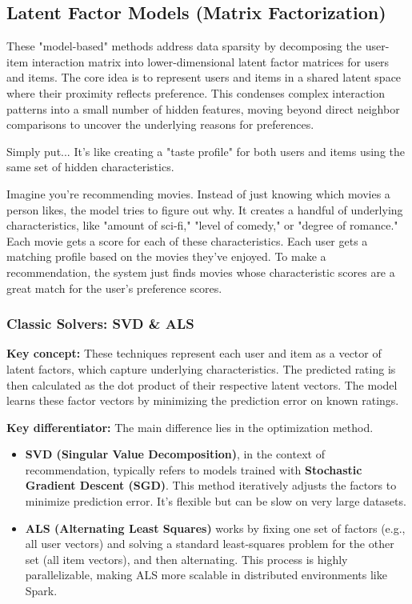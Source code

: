 \documentclass{article}
\begin{document}
    \subsection{Latent Factor Models (Matrix Factorization)}
    These "model-based" methods address data sparsity by decomposing the user-item interaction matrix into lower-dimensional latent factor matrices for users and items. The core idea is to represent users and items in a shared latent space where their proximity reflects preference. This condenses complex interaction patterns into a small number of hidden features, moving beyond direct neighbor comparisons to uncover the underlying reasons for preferences.
    
    \begin{asidebox}{Simply put...}
    It's like creating a "taste profile" for both users and items using the same set of hidden characteristics.
    
    Imagine you're recommending movies. Instead of just knowing which movies a person likes, the model tries to figure out why. It creates a handful of underlying characteristics, like "amount of sci-fi," "level of comedy," or "degree of romance." Each movie gets a score for each of these characteristics. Each user gets a matching profile based on the movies they've enjoyed. To make a recommendation, the system just finds movies whose characteristic scores are a great match for the user's preference scores.
    \end{asidebox}

    \subsubsection{Classic Solvers: SVD \& ALS}
\noindent\textbf{Key concept:} These techniques represent each user and item as a vector of latent factors, which capture underlying characteristics. The predicted rating is then calculated as the dot product of their respective latent vectors. The model learns these factor vectors by minimizing the prediction error on known ratings.

\noindent\textbf{Key differentiator:} The main difference lies in the optimization method.
    \begin{itemize}
        \item \textbf{SVD (Singular Value Decomposition)}, in the context of recommendation, typically refers to models trained with \textbf{Stochastic Gradient Descent (SGD)}. This method iteratively adjusts the factors to minimize prediction error. It's flexible but can be slow on very large datasets.
        \item \textbf{ALS (Alternating Least Squares)} works by fixing one set of factors (e.g., all user vectors) and solving a standard least-squares problem for the other set (all item vectors), and then alternating. This process is highly parallelizable, making ALS more scalable in distributed environments like Spark.
    \end{itemize}
\end{document}
